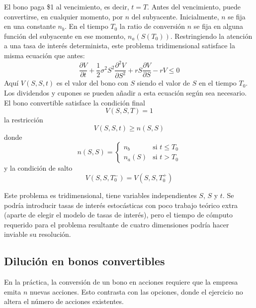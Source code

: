 El bono paga \$1 al vencimiento, es decir, $t = T$. Antes del vencimiento, puede convertirse, en cualquier momento, por $n$ del subyacente. Inicialmente, $n$ se fija en una constante $n_b$. En el tiempo $T_0$ la ratio de conversión $n$ se fija en alguna función del subyacente en ese momento, $n_a(S(T_0))$. Restringiendo la atención a una tasa de interés determinista, este problema tridimensional satisface la misma ecuación que antes:
\begin{equation*}
    \frac{\partial V}{\partial t} + \frac{1}{2}\sigma^2 S^2 \frac{\partial^2 V}{\partial S^2} + rS \frac{\partial V}{\partial S} - rV \leq 0
\end{equation*}
Aquí $V(S, S, t)$ es el valor del bono con $S$ siendo el valor de $S$ en el tiempo $T_0$. Los dividendos y cupones se pueden añadir a esta ecuación según sea necesario. El bono convertible satisface la condición final
\begin{equation*}
    \boxed{V(S, S, T) = 1}
\end{equation*}
la restricción
\begin{equation*}
    \boxed{V(S, S, t) \geq n(S, S)}
\end{equation*}
donde
\begin{equation*}
    n(S, S) = 
    \begin{cases}
        n_b & \text{si } t \leq T_0 \\
        n_a(S) & \text{si } t > T_0
    \end{cases}
\end{equation*}
y la condición de salto
\begin{equation*}
    \boxed{V(S, S, T_0^-) = V(S, S, T_0^+)}
\end{equation*}

Este problema es tridimensional, tiene variables independientes $S$, $S$ y $t$. Se podría introducir tasas de interés estocásticas con poco trabajo teórico extra (aparte de elegir el modelo de tasas de interés), pero el tiempo de cómputo requerido para el problema resultante de cuatro dimensiones podría hacer inviable su resolución.





\subsection{Dilución en bonos convertibles}

En la práctica, la conversión de un bono en acciones requiere que la empresa emita $n$ nuevas acciones. Esto contrasta con las opciones, donde el ejercicio no altera el número de acciones existentes.

